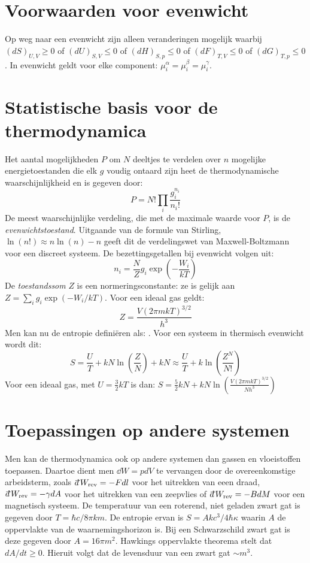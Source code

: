 \documentclass[twoside]{report}
\begin{document}
\section{Voorwaarden voor evenwicht}
Op weg naar een evenwicht zijn alleen veranderingen mogelijk waarbij
$(dS)_{U,V}\geq0$ of $(dU)_{S,V}\leq0$ of $(dH)_{S,p}\leq0$ of
$(dF)_{T,V}\leq0$ of $(dG)_{T,p}\leq0$. In evenwicht geldt voor elke
component: $\mu_i^\alpha=\mu_i^\beta=\mu_i^\gamma$.

\section{Statistische basis voor de thermodynamica}
Het aantal mogelijkheden $P$ om $N$ deeltjes te verdelen over $n$ mogelijke
energietoestanden die elk $g$ voudig ontaard zijn heet de thermodynamische
waarschijnlijkheid en is gegeven door:
\[
P=N!\prod_i\frac{g_i^{n_i}}{n_i!}
\]
De meest waarschijnlijke verdeling, die met de maximale waarde voor $P$, is
de {\it evenwichtstoestand}. Uitgaande van de formule van Stirling,
$\ln(n!)\approx n\ln(n)-n$ geeft dit de verdelingswet van Maxwell-Boltzmann
voor een discreet systeem. De bezettingsgetallen bij evenwicht volgen uit:
\[
n_i=\frac{N}{Z}g_i\exp\left(-\frac{W_i}{kT}\right)
\]
De {\it toestandssom} $Z$ is een normeringsconstante: ze is gelijk aan
$Z=\sum\limits_ig_i\exp(-W_i/kT)$. Voor een ideaal gas geldt:
\[
Z=\frac{V(2\pi mkT)^{3/2}}{h^3}
\]
Men kan nu de entropie defini\"eren als: . Voor een
systeem in thermisch evenwicht wordt dit:
\[
S=\frac{U}{T}+kN\ln\left(\frac{Z}{N}\right)+kN\approx\frac{U}{T}+k\ln\left(\frac{Z^N}{N!}\right)
\]
Voor een ideaal gas, met $U=\frac{3}{2}kT$ is dan:
$\displaystyle S=\mbox{$\frac{5}{2}$}kN+kN\ln\left(\frac{V(2\pi mkT)^{3/2}}{Nh^3}\right)$

\section{Toepassingen op andere systemen}
Men kan de thermodynamica ook op andere systemen dan gassen en vloeistoffen
toepassen. Daartoe dient men $\dd W=pdV$ te vervangen door de overeenkomstige
arbeidsterm, zoals $\dd W_{\rm rev}=-Fdl$ voor het uitrekken van eeen draad,
$\dd W_{\rm rev}=-\gamma dA$ voor het uitrekken van een zeepvlies of
$\dd W_{\rm rev}=-BdM$ voor een magnetisch systeem.
\npar
De temperatuur van een roterend, niet geladen zwart gat is gegeven door
$T=\hbar c/8\pi km$. De entropie ervan is $S=Akc^3/4\hbar\kappa$ waarin $A$
de oppervlakte van de waarnemingshorizon is. Bij een Schwarzschild zwart gat
is deze gegeven door $A=16\pi m^2$. Hawkings oppervlakte theorema stelt dat
$dA/dt\geq0$.
\npar
Hieruit volgt dat de levensduur van een zwart gat $\sim m^3$.
\end{document}
